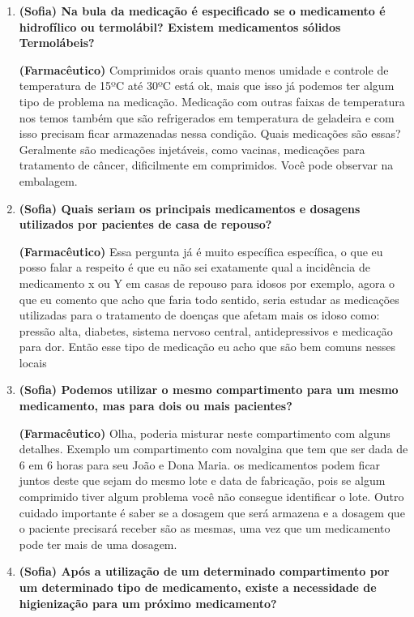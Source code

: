 \begin{apendicesenv}
\begin{enumerate}
\item \textbf{(Sofia) Na bula da medicação é especificado se o medicamento é hidrofílico ou termolábil? Existem medicamentos sólidos Termolábeis?}

\textbf{(Farmacêutico)} Comprimidos orais quanto menos umidade e controle de temperatura de 15ºC até 30ºC está ok, mais que isso já podemos ter algum tipo de problema na medicação. Medicação com outras faixas de temperatura nos temos também que são refrigerados em temperatura de geladeira e com isso precisam ficar armazenadas nessa condição. Quais medicações são essas? Geralmente são medicações injetáveis, como vacinas, medicações para tratamento de câncer, dificilmente em comprimidos. Você pode observar na embalagem.

\item \textbf{(Sofia) Quais seriam os principais medicamentos e dosagens utilizados por pacientes de casa de repouso?}

\textbf{(Farmacêutico)} Essa pergunta já é muito específica específica, o que eu posso falar a respeito é que eu não sei exatamente qual a incidência de medicamento x ou Y em casas de repouso para idosos por exemplo, agora o que eu comento que acho que faria todo sentido, seria estudar as medicações utilizadas para o tratamento de doenças que afetam mais os idoso como: pressão alta, diabetes, sistema nervoso central, antidepressivos e medicação para dor. Então esse tipo de medicação eu acho que são bem comuns nesses locais


\item \textbf{(Sofia) Podemos utilizar o mesmo compartimento para um mesmo medicamento, mas para dois ou mais pacientes?}

\textbf{(Farmacêutico)} Olha, poderia misturar neste compartimento com alguns detalhes. Exemplo um compartimento com novalgina que tem que ser dada de 6 em 6 horas para seu João e Dona Maria. os medicamentos podem ficar juntos deste que sejam do mesmo lote e data de fabricação, pois se algum comprimido tiver algum problema você não consegue identificar o lote. Outro cuidado importante é saber se a dosagem que será armazena e a dosagem que o paciente precisará receber são as mesmas, uma vez que um medicamento pode ter mais de uma dosagem. 

\item \textbf{(Sofia) Após a utilização de um determinado compartimento por um determinado tipo de medicamento, existe a necessidade de higienização para um próximo medicamento?}


\end{enumerate}
\end{apendicesenv}
